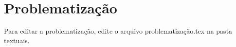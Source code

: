 \chapter{Problematização}
Para editar a problematização, edite o arquivo problematização.tex na pasta textuais. 